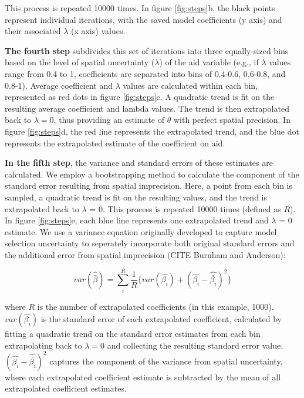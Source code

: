 This process is repeated 10000 times. 
In figure \ref{fig:steps}b, the black points represent individual iterations, with the saved model coefficients (y axis) and their associated $\lambda$ (x axis) values. 
\par
\textbf{The fourth step} subdivides this set of iterations into three equally-sized bins based on the level of spatial uncertainty ($\lambda$) of the aid variable (e.g., if $\lambda$ values range from 0.4 to 1, coefficients are separated into bins of 0.4-0.6, 0.6-0.8, and 0.8-1). 
Average coefficient and $\lambda$ values are calculated within each bin, represented as red dots in figure \ref{fig:steps}c. 
A quadratic trend is fit on the resulting average coefficient and lambda values. 
The trend is then extrapolated back to $\lambda=0$, thus providing an estimate of $\theta$ with perfect spatial precision. 
In figure \ref{fig:steps}d, the red line represents the extrapolated trend, and the blue dot represents the extrapolated estimate of the coefficient on aid. 
\par 

\textbf{In the fifth step}, the variance and standard errors of these estimates are calculated. 
We employ a bootstrapping method to calculate the component of the standard error resulting from spatial imprecision. Here, a point from each bin is sampled, a quadratic trend is fit on the resulting values, and the trend is extrapolated back to $\lambda$ = 0. 
This process is repeated 10000 times (defined as $R$). 
In figure \ref{fig:steps}e, each blue line represents one extrapolated trend and $\lambda$ = 0 estimate. 
We use a variance equation originally developed to capture model selection uncertainty to seperately incorporate both original standard errors and the additional error from spatial imprecision (CITE Burnham and Anderson):

\begin{equation}\label{variance}
var(\hat{\bar{\beta}}) = \sum_i^R \frac{1}{R} \{ var(\hat{\beta_i}) + (\hat{\beta_i}-\hat{\bar{\beta_i}})^2 \}
\end{equation}

\noindent where $R$ is the number of extrapolated coefficients (in this example, 1000). 
$var(\hat{\beta_i})$ is the standard error of each extrapolated coefficient, calculated by fitting a quadratic trend on the standard error estimates from each bin extrapolating back to $\lambda=0$ and collecting the resulting standard error value. 
$(\hat{\beta_i}-\hat{\bar{\beta_i}})^2$ captures the component of the variance from spatial uncertainty, where each extrapolated coefficient estimate is subtracted by the mean of all extrapolated coefficient estimates.  

